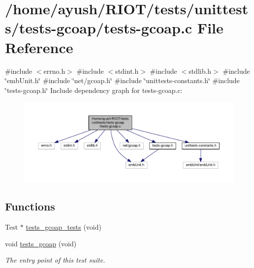 \hypertarget{tests-gcoap_8c}{}\section{/home/ayush/\+R\+I\+O\+T/tests/unittests/tests-\/gcoap/tests-\/gcoap.c File Reference}
\label{tests-gcoap_8c}
{\ttfamily \#include $<$errno.\+h$>$}\newline
{\ttfamily \#include $<$stdint.\+h$>$}\newline
{\ttfamily \#include $<$stdlib.\+h$>$}\newline
{\ttfamily \#include \char`\"{}emb\+Unit.\+h\char`\"{}}\newline
{\ttfamily \#include \char`\"{}net/gcoap.\+h\char`\"{}}\newline
{\ttfamily \#include \char`\"{}unittests-\/constants.\+h\char`\"{}}\newline
{\ttfamily \#include \char`\"{}tests-\/gcoap.\+h\char`\"{}}\newline
Include dependency graph for tests-\/gcoap.c\+:
\nopagebreak
\begin{figure}[H]
\begin{center}
\leavevmode
\includegraphics[width=350pt]{tests-gcoap_8c__incl}
\end{center}
\end{figure}
\subsection*{Functions}
\textbf{ }\par
\begin{DoxyCompactItemize}
\item 
Test $\ast$ \hyperlink{tests-gcoap_8c_a8f0dd03a14c51255b591cacf309611d8}{tests\+\_\+gcoap\+\_\+tests} (void)
\item 
void \hyperlink{group__unittests_gaa26c3c3743ce9c1e363f071dacf5afa0}{tests\+\_\+gcoap} (void)
\begin{DoxyCompactList}\small\item\em The entry point of this test suite. \end{DoxyCompactList}\end{DoxyCompactItemize}



